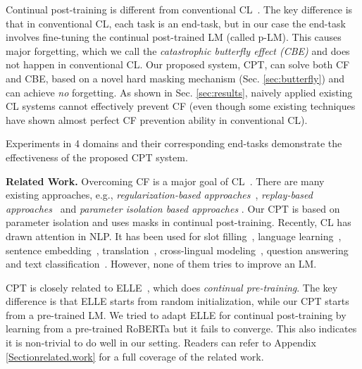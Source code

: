 \documentclass[11pt]{article}
\begin{document}
Continual post-training is different from conventional CL~\cite{chen2018lifelong}. The key difference is that in conventional CL, each task is an end-task, but in our case the end-task involves fine-tuning the continual post-trained LM (called p-LM). This causes major forgetting, which we call the \textit{catastrophic butterfly effect (CBE)} and does not happen in conventional CL. Our proposed system, CPT, can solve both CF and CBE, based on a novel hard masking mechanism (Sec. \ref{sec:butterfly}) and can achieve \textit{no} forgetting. As shown in Sec. \ref{sec:results}, naively applied existing CL systems cannot effectively prevent CF (even though some existing techniques have shown almost perfect CF prevention ability in conventional CL).

Experiments in 4 domains and their corresponding end-tasks demonstrate the effectiveness of the proposed CPT system. 

\vspace{+2mm}
\noindent
{\color{black}\textbf{Related Work.} Overcoming CF is a major goal of CL~\cite{chen2018lifelong}. There are many existing approaches, e.g., 
\textit{regularization-based approaches}~\cite{Kirkpatrick2017overcoming,Seff2017continual}, 
\textit{replay-based approaches}~\cite{Rebuffi2017,Lopez2017gradient} and  \textit{parameter isolation based approaches} \cite{Serra2018overcoming,fernando2017pathnet}. {\color{black}Our CPT is based on parameter isolation and uses masks in continual post-training.} Recently, CL has drawn attention in NLP. It has been used for slot filling~\cite{shen-etal-2019-progressive}, language learning~\cite{li2019compositional}, sentence embedding~\cite{liu2019continual}, translation~\cite{khayrallah2018regularized}, cross-lingual modeling~\cite{liu2020exploring}, question answering~\cite{greco2019psycholinguistics} and text classification~\cite{DBLP:journals/corr/abs-2112-02706,ke2021Classic,sun2020lamol,huang2021continual,chuang2020lifelong,mehta2021empirical,madotto2020continual}. However, none of them tries to improve an LM.

CPT is closely related to ELLE~\cite{DBLP:conf/acl/QinZLL0SZ22}, which does \textit{continual pre-training}. The key difference is that ELLE starts from random initialization, while our CPT starts from a pre-trained LM. We tried to adapt ELLE for continual post-training by learning from a pre-trained RoBERTa but it fails to converge. This also indicates it is non-trivial to do well in our setting. Readers can refer to Appendix \ref{Sectionrelated.work} for a full coverage of the related work.
}
\end{document}

